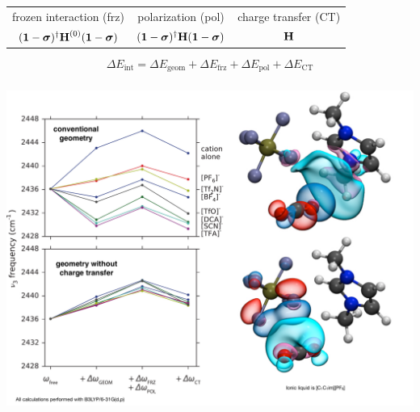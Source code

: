 \documentclass[%
    xcolor=usenames,dvipsnames,svgnames%
]{beamer}
\newenvironment{nscenter}
 {\parskip=0pt\par\nopagebreak\centering}
 {\par\noindent\ignorespacesafterend}
\begin{document}
\begin{frame}
\begin{table}
\begin{tabular}{ccc}
      frozen interaction (frz) & polarization (pol) & charge transfer (CT) \\
      \((\boldsymbol{\mathbf{1}} - \boldsymbol{\mathbf{\sigma}})^{\dagger} \boldsymbol{\mathbf{H}}^{(0)} (\boldsymbol{\mathbf{1}} - \boldsymbol{\mathbf{\sigma}})\) & \((\boldsymbol{\mathbf{1}} - \boldsymbol{\mathbf{\sigma}})^{\dagger} \boldsymbol{\mathbf{H}} (\boldsymbol{\mathbf{1}} - \boldsymbol{\mathbf{\sigma}})\) & \(\boldsymbol{\mathbf{H}}\)
    \end{tabular}
  \end{table}
  \begin{equation*}
    \Delta E_{\text{int}} = \Delta E_{\text{geom}} + \Delta E_{\text{frz}} + \Delta E_{\text{pol}} + \Delta E_{\text{CT}}
  \end{equation*}
\end{frame}


\begin{frame}[fragile]
  \frametitle{}
  \begin{nscenter}
    \includegraphics[scale=0.28]{./figures/ionic_liquid_geometry_dependence_on_ct_combined.pdf}
  \end{nscenter}
\end{frame}
\end{document}

